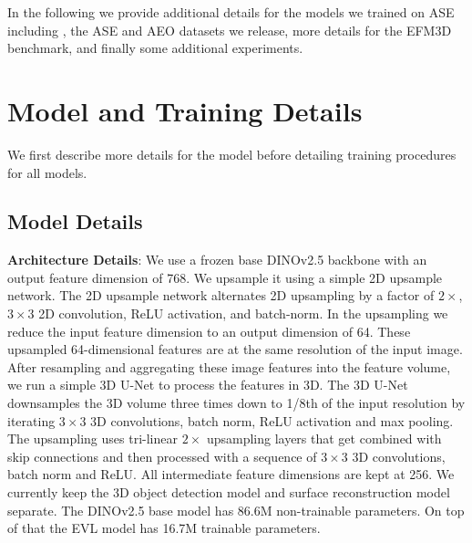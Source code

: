 
In the following we provide additional details for the models we trained on ASE including \EVL{}, the ASE and AEO datasets we release,  more details for the EFM3D benchmark, and finally some additional experiments. 

\section{Model and Training Details}

We first describe more details for the \EVL{} model before detailing training procedures for all models.

\subsection{\EVL{} Model Details}

\noindent\textbf{\EVL{} Architecture Details}:
We use a frozen base DINOv2.5 backbone with an output feature dimension of 768. We upsample it using a simple 2D upsample network.
The 2D upsample network alternates 2D upsampling by a factor of $2\times$, $3\times3$ 2D convolution, ReLU activation, and batch-norm. In the upsampling we reduce the input feature dimension to an output dimension of 64. These upsampled 64-dimensional features are at the same resolution of the input image.
%
After resampling and aggregating these image features into the feature volume, we run a simple 3D U-Net to process the features in 3D.
The 3D U-Net downsamples the 3D volume three times down to 1/8th of the input resolution by iterating $3\times 3$ 3D convolutions, batch norm, ReLU activation and max pooling. The upsampling uses tri-linear $2\times$ upsampling layers that get combined with skip connections and then processed with a sequence of $3\times 3$ 3D convolutions, batch norm and ReLU. All intermediate feature dimensions are kept at 256. We currently keep the 3D object detection model and surface reconstruction model separate. 
The DINOv2.5 base model has 86.6M non-trainable parameters. 
On top of that the EVL model has 16.7M trainable parameters.  



